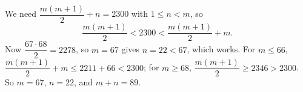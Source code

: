 We need $\dfrac{m(m+1)}{2}+n=2300$ with $1\le n<m$, so
\[
\dfrac{m(m+1)}{2}<2300<\dfrac{m(m+1)}{2}+m .
\]
Now $\dfrac{67\cdot68}{2}=2278$, so $m=67$ gives $n=22<67$, which works. For $m\le66$, $\dfrac{m(m+1)}{2}+m\le2211+66<2300$; for $m\ge68$, $\dfrac{m(m+1)}{2}\ge2346>2300$. So $m=67$, $n=22$, and $m+n=\boxed{89}$.
